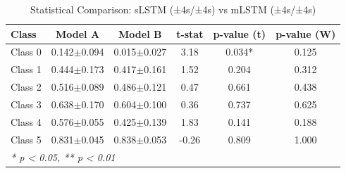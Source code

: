 \begin{table}[htbp]
\centering
\caption{Statistical Comparison: sLSTM (±4s/±4s) vs mLSTM (±4s/±4s)}
\label{tab:comparison_class_slstm_±4s_±4s_vs_mlstm_±4s_±4s}
\begin{tabular}{lccccc}
\toprule
\textbf{Class} & \textbf{Model A} & \textbf{Model B} & \textbf{t-stat} & \textbf{p-value (t)} & \textbf{p-value (W)} \\
\midrule
Class 0 & 0.142$\pm$0.094 & 0.015$\pm$0.027 & 3.18 & 0.034* & 0.125 \\
Class 1 & 0.444$\pm$0.173 & 0.417$\pm$0.161 & 1.52 & 0.204 & 0.312 \\
Class 2 & 0.516$\pm$0.089 & 0.486$\pm$0.121 & 0.47 & 0.661 & 0.438 \\
Class 3 & 0.638$\pm$0.170 & 0.604$\pm$0.100 & 0.36 & 0.737 & 0.625 \\
Class 4 & 0.576$\pm$0.055 & 0.425$\pm$0.139 & 1.83 & 0.141 & 0.188 \\
Class 5 & 0.831$\pm$0.045 & 0.838$\pm$0.053 & -0.26 & 0.809 & 1.000 \\
\bottomrule
\multicolumn{6}{l}{\textit{* p < 0.05, ** p < 0.01}} \\
\end{tabular}
\end{table}